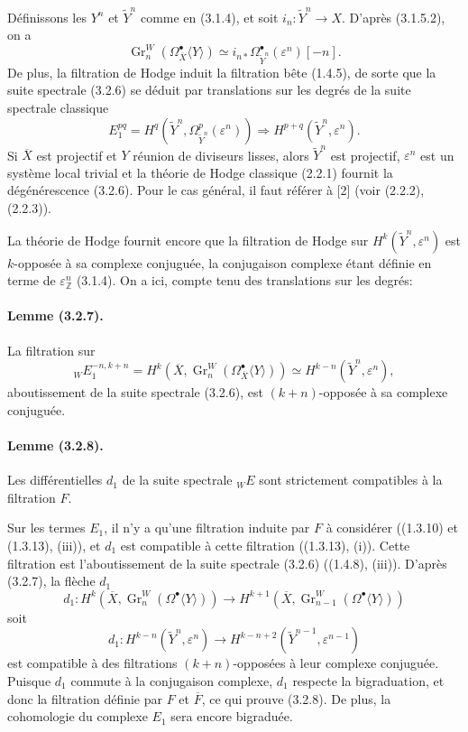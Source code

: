 \documentclass[10pt]{article}
\newcommand{\Z}{\mathbb Z}
\newcommand{\Gr}{\operatorname{Gr}}
\begin{document}
Définissons les $Y^n$ et $\widetilde Y^n$ comme en (3.1.4), et soit $i_n:\widetilde Y^n\to X$. D'après (3.1.5.2), on a
\[
\Gr_n^W(\Omega_{\overline X}^{\bullet}\langle Y\rangle)
\simeq i_{n*}\Omega_{\widetilde Y^n}^{\bullet}(\varepsilon^n)[-n].
\]
De plus, la filtration de Hodge induit la filtration bête (1.4.5), de sorte que la suite spectrale (3.2.6) se déduit par translations sur les degrés de la suite spectrale classique
\[
E_1^{pq}=H^q(\widetilde Y^n,\Omega_{\widetilde Y^n}^p(\varepsilon^n))
\Longrightarrow H^{p+q}(\widetilde Y^n,\varepsilon^n).
\]
Si $\overline X$ est projectif et $Y$ réunion de diviseurs lisses, alors $\widetilde Y^n$ est projectif, $\varepsilon^n$ est un système local trivial et la théorie de Hodge classique (2.2.1) fournit la dégénérescence (3.2.6). Pour le cas général, il faut référer à [2] (voir (2.2.2), (2.2.3)).

La théorie de Hodge fournit encore que la filtration de Hodge sur $H^k(\widetilde Y^n,\varepsilon^n)$ est $k$-opposée à sa complexe conjuguée, la conjugaison complexe étant définie en terme de $\varepsilon^n_\Z$ (3.1.4). On a ici, compte tenu des translations sur les degrés:

\paragraph{Lemme (3.2.7).} La filtration sur
\[
{}_W E_1^{-n,k+n}
=H^k(\overline X,\Gr_n^W(\Omega_{\overline X}^{\bullet}\langle Y\rangle))
\simeq H^{k-n}(\widetilde Y^n,\varepsilon^n),
\]
aboutissement de la suite spectrale (3.2.6), est $(k+n)$-opposée à sa complexe conjuguée.

\paragraph{Lemme (3.2.8).} Les différentielles $d_1$ de la suite spectrale ${}_WE$ sont strictement compatibles à la filtration $F$.

Sur les termes $E_1$, il n'y a qu'une filtration induite par $F$ à considérer ((1.3.10) et (1.3.13), (iii)), et $d_1$ est compatible à cette filtration ((1.3.13), (i)). Cette filtration est l'aboutissement de la suite spectrale (3.2.6) ((1.4.8), (iii)). D'après (3.2.7), la flèche $d_1$
\[
d_1:H^k(\overline X,\Gr_n^W(\Omega^\bullet\langle Y\rangle))
\longrightarrow
H^{k+1}(\overline X,\Gr_{n-1}^W(\Omega^\bullet\langle Y\rangle))
\]
soit
\[
\tag{3.2.8.1}
d_1:H^{k-n}(\widetilde Y^n,\varepsilon^n)
\longrightarrow
H^{k-n+2}(\widetilde Y^{n-1},\varepsilon^{n-1})
\]
est compatible à des filtrations $(k+n)$-opposées à leur complexe conjuguée. Puisque $d_1$ commute à la conjugaison complexe, $d_1$ respecte la bigraduation, et donc la filtration définie par $F$ et $\overline F$, ce qui prouve (3.2.8). De plus, la cohomologie du complexe $E_1$ sera encore bigraduée.
\end{document}
